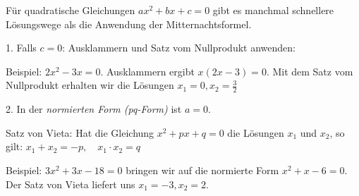 \documentclass[11pt]{beamer}
\begin{document}
\begin{frame}[fragile]
 
Für quadratische Gleichungen $ax^2+bx+c=0$ gibt es manchmal schnellere Lösungswege als die Anwendung der
Mitternachtsformel.

1. Falls $c=0$: Ausklammern und Satz vom Nullprodukt anwenden: 

\footnotesize
Beispiel: $2x^2-3x = 0$. Ausklammern ergibt $x(2x-3)=0$. Mit dem Satz vom Nullprodukt erhalten wir die Lösungen
$x_1 = 0, x_2 = \frac{3}{2}$

\normalsize
2. In der \textit{normierten Form (pq-Form)} ist $a=0$.

Satz von Vieta: Hat die Gleichung  $x^2 +px +q =0$ die Lösungen $x_1$ und $x_2$, so gilt:
$x_1 + x_2 = -p, \quad x_1 \cdot x_2 = q$ 

\footnotesize
Beispiel: $3x^2+3x-18=0$ bringen wir auf die normierte Form $x^2+x-6=0$. Der Satz von Vieta liefert uns $x_1=-3, x_2 = 2$.


\end{frame}
\end{document}
